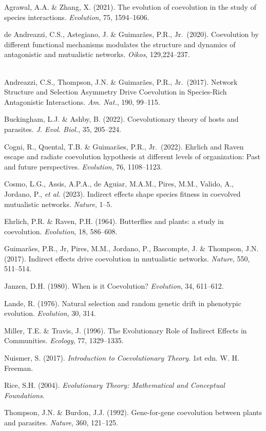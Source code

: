 \documentclass[
]{book}
\begin{document}
Agrawal, A.A. \& Zhang, X. (2021). The evolution of coevolution in the study of species interactions. \emph{Evolution}, 75, 1594--1606.

de Andreazzi, C.S., Astegiano, J. \& Guimarães, P.R., Jr.~(2020). Coevolution by different functional mechanisms modulates the structure and dynamics of antagonistic and mutualistic networks. \emph{Oikos}, 129,224--237.\\
\strut \\
Andreazzi, C.S., Thompson, J.N. \& Guimarães, P.R., Jr.~(2017). Network Structure and Selection Asymmetry Drive Coevolution in Species-Rich Antagonistic Interactions. \emph{Am. Nat.}, 190, 99--115.

Buckingham, L.J. \& Ashby, B. (2022). Coevolutionary theory of hosts and parasites. \emph{J. Evol. Biol.}, 35, 205--224.

Cogni, R., Quental, T.B. \& Guimarães, P.R., Jr.~(2022). Ehrlich and Raven escape and radiate coevolution hypothesis at different levels of organization: Past and future perspectives. \emph{Evolution}, 76, 1108--1123.

Cosmo, L.G., Assis, A.P.A., de Aguiar, M.A.M., Pires, M.M., Valido, A., Jordano, P., \emph{et al.} (2023). Indirect effects shape species fitness in coevolved mutualistic networks. \emph{Nature}, 1--5.

Ehrlich, P.R. \& Raven, P.H. (1964). Butterflies and plants: a study in coevolution. \emph{Evolution}, 18, 586--608.

Guimarães, P.R., Jr, Pires, M.M., Jordano, P., Bascompte, J. \& Thompson, J.N. (2017). Indirect effects drive coevolution in mutualistic networks. \emph{Nature}, 550, 511--514.

Janzen, D.H. (1980). When is it Coevolution? \emph{Evolution}, 34, 611--612.

Lande, R. (1976). Natural selection and random genetic drift in phenotypic evolution. \emph{Evolution}, 30, 314.

Miller, T.E. \& Travis, J. (1996). The Evolutionary Role of Indirect Effects in Communities. \emph{Ecology}, 77, 1329--1335.

Nuismer, S. (2017). \emph{Introduction to Coevolutionary Theory}. 1st edn. W. H. Freeman.

Rice, S.H. (2004). \emph{Evolutionary Theory: Mathematical and Conceptual Foundations}.

Thompson, J.N. \& Burdon, J.J. (1992). Gene-for-gene coevolution between plants and parasites. \emph{Nature}, 360, 121--125.
\end{document}
